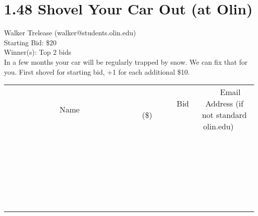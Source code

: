\documentclass[11pt]{article}
\begin{document}
\section*{1.48 Shovel Your Car Out (at Olin)}
Walker Trelease (walker@students.olin.edu) \\
Starting Bid: \$20 \\
Winner(s): 
Top 2 bids \\
In a few months your car will be regularly trapped by snow. We can fix that for you. First shovel for starting bid, +1 for each additional \$10. \\[6ex]
\begin{tabular}{c c c}
~~~~~~~~~~~~~Name~~~~~~~~~~~~~ & ~~~~~~~~~Bid (\$)~~~~~~~~~ & ~~~Email Address (if not standard olin.edu)~~~ \\
 & & \\
\hline
 & & \\
\hline
 & & \\
\hline
 & & \\
\hline
 & & \\
\hline
 & & \\
\hline
 & & \\
\hline
 & & \\
\hline
 & & \\
\hline
 & & \\
\hline
 & & \\
\hline
 & & \\
\hline
 & & \\
\hline
 & & \\
\hline
 & & \\
\hline
 & & \\
\hline
 & & \\
\hline
 & & \\
\hline
 & & \\
\hline
 & & \\
\hline
 & & \\
\hline
 & & \\
\hline
 & & \\
\hline
 & & \\
\hline
 & & \\
\hline
 & & \\
\hline
\end{tabular}
\clearpage
\end{document}
